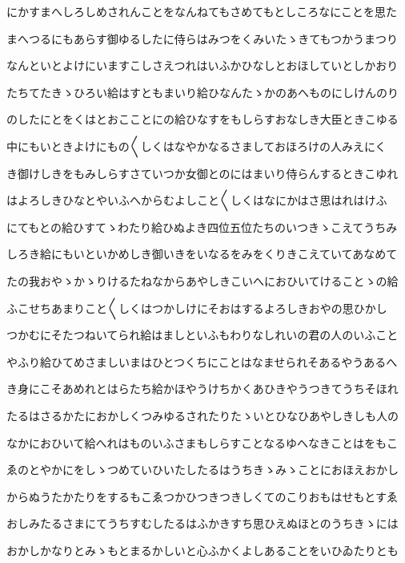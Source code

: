 \documentclass[a4paper,11pt,landscape]{ltjtarticle}
\begin{document}
\par\medskip
にかすまへしろしめされんことをなんねてもさめてもとしころなにことを思た
\par\medskip
まへつるにもあらす御ゆるしたに侍らはみつをくみいたゝきてもつかうまつり
\par\medskip
なんといとよけにいますこしさえつれはいふかひなしとおほしていとしかおり
\par\medskip
たちてたきゝひろい給はすともまいり給ひなんたゝかのあへものにしけんのり
\par\medskip
のしたにとをくはとおこことにの給ひなすをもしらすおなしき大臣ときこゆる
\par\medskip
中にもいときよけにもの〱しくはなやかなるさましておほろけの人みえにく
\par\medskip
き御けしきをもみしらすさていつか女御とのにはまいり侍らんするときこゆれ
\par\medskip
はよろしきひなとやいふへからむよしこと〱しくはなにかはさ思はれはけふ
\par\medskip
にてもとの給ひすてゝわたり給ひぬよき四位五位たちのいつきゝこえてうちみ
\par\medskip
しろき給にもいといかめしき御いきをいなるをみをくりきこえていてあなめて
\par\medskip
たの我おやゝかゝりけるたねなからあやしきこいへにおひいてけることゝの給
\par\medskip
ふこせちあまりこと〱しくはつかしけにそおはするよろしきおやの思ひかし
\par\medskip
つかむにそたつねいてられ給はましといふもわりなしれいの君の人のいふこと
\par\medskip
やふり給ひてめさましいまはひとつくちにことはなませられそあるやうあるへ
\par\medskip
き身にこそあめれとはらたち給かほやうけちかくあひきやうつきてうちそほれ
\par\medskip
たるはさるかたにおかしくつみゆるされたりたゝいとひなひあやしきしも人の
\par\medskip
なかにおひいて給へれはものいふさまもしらすことなるゆへなきことはをもこ
\par\medskip
ゑのとやかにをしゝつめていひいたしたるはうちきゝみゝことにおほえおかし
\par\medskip
からぬうたかたりをするもこゑつかひつきつきしくてのこりおもはせもとすゑ
\par\medskip
おしみたるさまにてうちすむしたるはふかきすち思ひえぬほとのうちきゝには
\par\medskip
おかしかなりとみゝもとまるかしいと心ふかくよしあることをいひゐたりとも
\par\medskip
\end{document}
